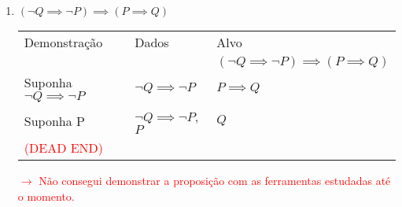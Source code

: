 \documentclass[a4paper, 12pt]{article}
\begin{document}
\begin{enumerate}
\begin{enumerate}[1.]
        \newpage
        \item $(\neg Q \implies \neg P)\implies (P \implies Q)$
        \begin{table}[h!]
            \centering
            \begin{tabular}{|p{4cm} | p{4cm} | p{4cm} |}
            \rowcolor{gray!50}
            Demonstração & Dados & Alvo \\
            & & $(\neg Q \implies \neg P)\implies (P \implies Q)$\\
            Suponha $\neg Q \implies \neg P$ & $\neg Q \implies \neg P$ & $P \implies Q$\\
            Suponha P & $\neg Q \implies \neg P$, $P$ & $Q$\\
            \textcolor{red}{(DEAD END)} & & \\
            \hline
            \end{tabular}
        \end{table}

        \textcolor{red}{$\rightarrow$ Não consegui demonstrar a proposição com as ferramentas estudadas até o momento.}

    \end{enumerate}


\end{enumerate}
\end{document}
